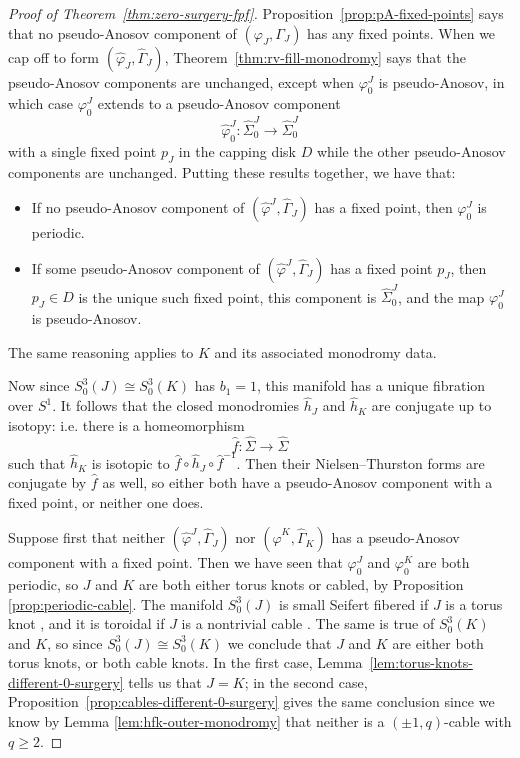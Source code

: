 \documentclass[11pt]{amsart}
\numberwithin{equation}{section}
\numberwithin{theorem}{section}
\theoremstyle{definition}
\begin{document}
\begin{proof}[Proof of Theorem~\ref{thm:zero-surgery-fpf}]
Proposition~\ref{prop:pA-fixed-points} says that no pseudo-Anosov component of $(\varphi_J,\Gamma_J)$ has any fixed points.  When we cap off to form $(\hat\varphi_J,\hat\Gamma_J)$, Theorem~\ref{thm:rv-fill-monodromy} says that the pseudo-Anosov components are unchanged, except when $\varphi^J_0$ is pseudo-Anosov, in which case $\varphi_0^J$ extends to a pseudo-Anosov component  \[\hat\varphi^J_0: \hat\Sigma^J_0 \to \hat\Sigma^J_0\] with a single fixed point $p_J$ in the capping disk $D$ while the other pseudo-Anosov components are unchanged.  Putting these results together, we have that:
\begin{itemize}
\item If no pseudo-Anosov component of $(\hat\varphi^J,\hat\Gamma_J)$ has a fixed point, then $\varphi^J_0$ is periodic.\vspace{1mm}
\item If some pseudo-Anosov component of $(\hat\varphi^J,\hat\Gamma_J)$ has a fixed point $p_J$, then $p_J \in D$ is the unique such fixed point, this component is $\hat\Sigma^J_0$, and the map $\varphi^J_0$ is pseudo-Anosov.
\end{itemize}
The same reasoning applies to $K$ and its associated monodromy data.


Now since $S^3_0(J) \cong S^3_0(K)$ has $b_1 = 1$, this manifold has a unique fibration over $S^1$. It follows that the closed monodromies $\hat{h}_J$ and $\hat{h}_K$ are conjugate up to isotopy: i.e. there is a homeomorphism
\[ \hat{f}: \hat\Sigma \to \hat\Sigma \]
such that $\hat{h}_K$ is isotopic to $\hat{f} \circ \hat{h}_J \circ \hat{f}^{-1}$.   Then their Nielsen--Thurston forms are conjugate by $\hat f$ as well, so either both have a pseudo-Anosov component with a fixed point, or neither one does.

Suppose first that neither $(\hat\varphi^J,\hat\Gamma_J)$ nor $(\hat\varphi^K,\hat\Gamma_K)$ has a pseudo-Anosov component with a fixed point.  Then we have seen that $\varphi^J_0$ and $\varphi^K_0$ are both periodic, so $J$ and $K$ are both either torus knots or cabled, by Proposition \ref{prop:periodic-cable}.  The manifold $S^3_0(J)$ is small Seifert fibered if $J$ is a torus knot \cite{moser}, and it is toroidal if $J$ is a nontrivial cable \cite[Corollary~7.3]{gordon}.  The same is true of $S^3_0(K)$ and $K$, so since $S^3_0(J) \cong S^3_0(K)$ we conclude that $J$ and $K$ are either both torus knots, or both cable knots.  In the first case, Lemma~\ref{lem:torus-knots-different-0-surgery}  tells us that $J=K$; in the second case, Proposition~\ref{prop:cables-different-0-surgery} gives the same conclusion since we know by Lemma \ref{lem:hfk-outer-monodromy} that neither is a $(\pm 1,q)$-cable with $q\geq 2$.


\end{proof}
\end{document}
